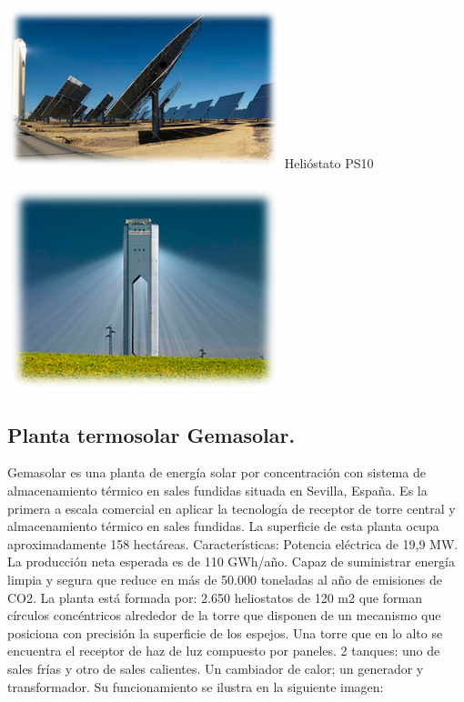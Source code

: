 \documentclass[12pt]{article}
\begin{document}
\includegraphics[width=\textwidth]{unnamed (2).png}
Helióstato PS10

\includegraphics[width=\textwidth]{unnamed (3).png}
\cite{ValenticampderrosWebSite}

\subsection{Planta termosolar Gemasolar.}

Gemasolar es una planta de energía solar por concentración con sistema de almacenamiento térmico en sales fundidas situada en Sevilla, España. Es la primera a escala comercial en aplicar la tecnología de receptor de torre central y almacenamiento térmico en sales fundidas. La superficie de esta planta ocupa aproximadamente 158 hectáreas. Características:
Potencia eléctrica de 19,9 MW.
La producción neta esperada es de 110 GWh/año.
Capaz de suministrar energía limpia y segura que reduce en más de 50.000 toneladas al año de emisiones de CO2.
La planta está formada por:
2.650 heliostatos de 120 m2 que forman círculos concéntricos alrededor de la torre que disponen de un mecanismo que posiciona con precisión la superficie de los espejos.
Una torre que en lo alto se encuentra el receptor de haz de luz compuesto por paneles.
2 tanques: uno de sales frías y otro de sales calientes.
Un cambiador de calor; un generador y transformador.
Su funcionamiento se ilustra en la siguiente imagen:
\end{document}
